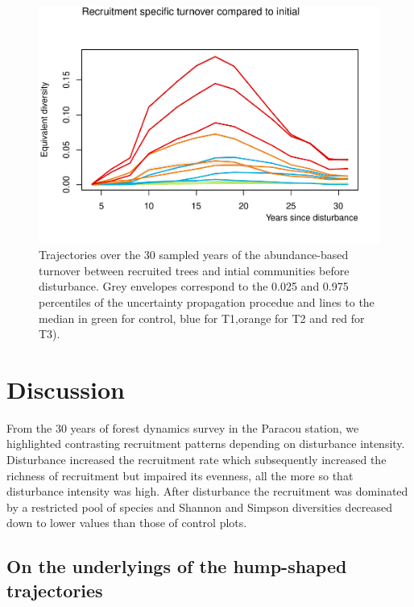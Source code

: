 \documentclass[fleqn,10pt]{ArtEcoFoG} %
\begin{document}
\begin{figure}

{\centering \includegraphics{RecruitmentTrajectories_files/figure-latex/Fig4-1} 

}

\caption{Trajectories over the 30 sampled years of the abundance-based turnover between recruited trees and intial communities before disturbance. Grey envelopes correspond to the 0.025 and 0.975 percentiles of the uncertainty propagation procedue and lines to the median in green for control, blue for T1,orange for T2 and red for T3).}\label{fig:Fig4}
\end{figure}

\section{Discussion}\label{discussion}

From the 30 years of forest dynamics survey in the Paracou station, we
highlighted contrasting recruitment patterns depending on disturbance
intensity. Disturbance increased the recruitment rate which subsequently
increased the richness of recruitment but impaired its evenness, all the
more so that disturbance intensity was high. After disturbance the
recruitment was dominated by a restricted pool of species and Shannon
and Simpson diversities decreased down to lower values than those of
control plots.

\subsection{On the underlyings of the hump-shaped
trajectories}\label{on-the-underlyings-of-the-hump-shaped-trajectories}
\end{document}
